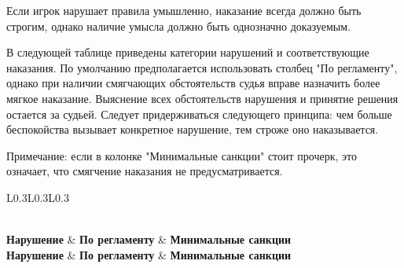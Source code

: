 Если игрок нарушает правила умышленно, наказание всегда должно быть строгим, однако наличие умысла должно быть однозначно доказуемым.

В следующей таблице приведены категории нарушений и соответствующие наказания. По умолчанию предполагается использовать столбец "По регламенту", однако при наличии смягчающих обстоятельств судья вправе назначить более мягкое наказание. Выяснение всех обстоятельств нарушения и принятие решения остается за судьей. Следует придерживаться следующего принципа: чем больше беспокойства вызывает конкретное нарушение, тем строже оно наказывается.

Примечание: если в колонке "Минимальные санкции" стоит прочерк, это означает, что смягчение наказания не предусматривается.

\noindent\begin{tabularx}{\linewidth}{L{0.3\linewidth}L{0.3\linewidth}L{0.3\linewidth}}
	\caption{Обоснования штрафов} \\
	\toprule
	\textbf{Нарушение} & \textbf{По регламенту} & \textbf{Минимальные санкции} \\
	\endfirsthead
	\toprule
	\textbf{Нарушение} & \textbf{По регламенту} & \textbf{Минимальные санкции} \\
	\midrule
	\endhead
	\endfoot
	\bottomrule
	\endlastfoot


\end{tabularx}
